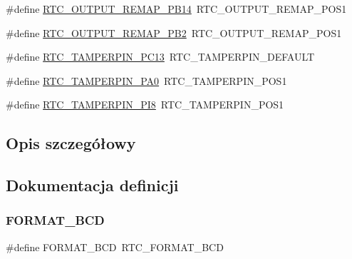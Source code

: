 \begin{DoxyCompactItemize}
\item 
\#define \hyperlink{group___h_a_l___r_t_c___aliased___defines_gac67309963a2eaf95230e716c8e3f0377}{R\+T\+C\+\_\+\+O\+U\+T\+P\+U\+T\+\_\+\+R\+E\+M\+A\+P\+\_\+\+P\+B14}~R\+T\+C\+\_\+\+O\+U\+T\+P\+U\+T\+\_\+\+R\+E\+M\+A\+P\+\_\+\+P\+O\+S1
\item 
\#define \hyperlink{group___h_a_l___r_t_c___aliased___defines_gae3219018581da1cc5687fe218d3f2a2d}{R\+T\+C\+\_\+\+O\+U\+T\+P\+U\+T\+\_\+\+R\+E\+M\+A\+P\+\_\+\+P\+B2}~R\+T\+C\+\_\+\+O\+U\+T\+P\+U\+T\+\_\+\+R\+E\+M\+A\+P\+\_\+\+P\+O\+S1
\item 
\#define \hyperlink{group___h_a_l___r_t_c___aliased___defines_ga203603ca0741ea3f23beca505a121351}{R\+T\+C\+\_\+\+T\+A\+M\+P\+E\+R\+P\+I\+N\+\_\+\+P\+C13}~R\+T\+C\+\_\+\+T\+A\+M\+P\+E\+R\+P\+I\+N\+\_\+\+D\+E\+F\+A\+U\+LT
\item 
\#define \hyperlink{group___h_a_l___r_t_c___aliased___defines_ga0eddec9c4aeae415fe983c2940a45a9d}{R\+T\+C\+\_\+\+T\+A\+M\+P\+E\+R\+P\+I\+N\+\_\+\+P\+A0}~R\+T\+C\+\_\+\+T\+A\+M\+P\+E\+R\+P\+I\+N\+\_\+\+P\+O\+S1
\item 
\#define \hyperlink{group___h_a_l___r_t_c___aliased___defines_ga281fbac5fa3ba4677a329635519f2bb5}{R\+T\+C\+\_\+\+T\+A\+M\+P\+E\+R\+P\+I\+N\+\_\+\+P\+I8}~R\+T\+C\+\_\+\+T\+A\+M\+P\+E\+R\+P\+I\+N\+\_\+\+P\+O\+S1
\end{DoxyCompactItemize}


\subsection{Opis szczegółowy}


\subsection{Dokumentacja definicji}
\mbox{\label{group___h_a_l___r_t_c___aliased___defines_ga950fc88b539cc9a8cf66aab2ee860fe1}} 
\subsubsection{\texorpdfstring{F\+O\+R\+M\+A\+T\+\_\+\+B\+CD}{FORMAT\_BCD}}
{\footnotesize\ttfamily \#define F\+O\+R\+M\+A\+T\+\_\+\+B\+CD~R\+T\+C\+\_\+\+F\+O\+R\+M\+A\+T\+\_\+\+B\+CD}



